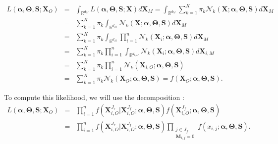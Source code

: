 \documentclass[12pt,a4paper]{report}
\begin{document}
\begin{eqnarray}
	L(\boldsymbol{\alpha},\boldsymbol{\Theta},\boldsymbol{S};\boldsymbol{X}_O)&=&\int_{\mathbb{R}^{d_M}}L(\boldsymbol{\alpha},\boldsymbol{\Theta},\boldsymbol{S};\boldsymbol{X})d\boldsymbol{X}_M 
	=\int_{\mathbb{R}^{d_M}}\sum_{k=1}^K \pi_k \mathcal{N}_k(\boldsymbol{X};\boldsymbol{\alpha},\boldsymbol{\Theta},\boldsymbol{S})d\boldsymbol{X}_M  \nonumber \\
	&=&\sum_{k=1}^K \pi_k \int_{\mathbb{R}^{d_M}}\mathcal{N}_k(\boldsymbol{X};\boldsymbol{\alpha},\boldsymbol{\Theta},\boldsymbol{S})d\boldsymbol{X}_M  \nonumber \\
	&=&\sum_{k=1}^K \pi_k \int_{\mathbb{R}^{d_M}}\prod_{i=1}^n\mathcal{N}_k(\boldsymbol{X}_i;\boldsymbol{\alpha},\boldsymbol{\Theta},\boldsymbol{S})d\boldsymbol{X}_M  \nonumber \\
	&=&\sum_{k=1}^K \pi_k \prod_{i=1}^n\int_{\mathbb{R}^{d_{i,M}}}\mathcal{N}_k(\boldsymbol{X}_i;\boldsymbol{\alpha},\boldsymbol{\Theta},\boldsymbol{S})d\boldsymbol{X}_{i,M} \nonumber  \\
	&=&\sum_{k=1}^K \pi_k \prod_{i=1}^n\mathcal{N}_k(\boldsymbol{X}_{i,O};\boldsymbol{\alpha},\boldsymbol{\Theta},\boldsymbol{S}) \nonumber \\
	&=&\sum_{k=1}^K \pi_k \mathcal{N}_k(\boldsymbol{X}_{O};\boldsymbol{\alpha},\boldsymbol{\Theta},\boldsymbol{S})=f(\boldsymbol{X}_{O};\boldsymbol{\alpha},\boldsymbol{\Theta},\boldsymbol{S}). \nonumber 
\end{eqnarray}






To compute this likelihood, we will use the decomposition :
\begin{eqnarray}
	L(\boldsymbol{\alpha},\boldsymbol{\Theta},\boldsymbol{S};\boldsymbol{X}_O)&=& %
	\prod_{i=1}^nf(\boldsymbol{X}^{J_r}_{i,O}|\boldsymbol{X}^{J_f}_{i,O};\boldsymbol{\alpha},\boldsymbol{\Theta},\boldsymbol{S})f(\boldsymbol{X}^{J_f}_{i,O};\boldsymbol{\alpha},\boldsymbol{\Theta},\boldsymbol{S})\quad   \nonumber \\
	&=&\prod_{i=1}^nf(\boldsymbol{X}^{J_r}_{i,O}|\boldsymbol{X}^{J_f}_{i,O};\boldsymbol{\alpha},\boldsymbol{\Theta},\boldsymbol{S})\prod_{\substack{j \in J_f \\ \boldsymbol{M}_{i,j}=0}}f(x_{i,j};\boldsymbol{\alpha},\boldsymbol{\Theta},\boldsymbol{S}).\label{likmiss}
\end{eqnarray}
\end{document}
